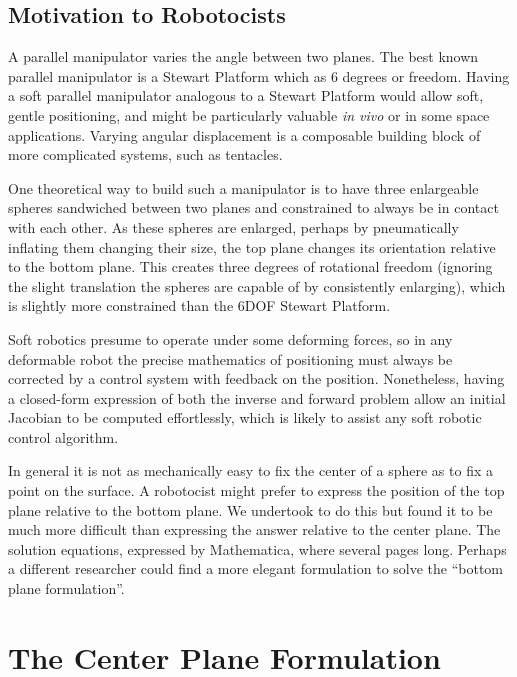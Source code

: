 \documentclass{article}
\begin{document}
\subsection{Motivation to Robotocists}

A parallel manipulator varies the angle between two planes.
The best known parallel manipulator is
a Stewart Platform\cite{wiki:stewart} which as 6 degrees or freedom.
Having a soft parallel manipulator analogous to a Stewart Platform would allow soft,
gentle positioning,
and might be particularly valuable {\it in vivo}\cite{white2018soft} or in some space applications\cite{glassner2020soft}.
Varying angular displacement is a composable building block of more complicated systems, such as tentacles.

One theoretical way to build such a manipulator is to have three enlargeable spheres sandwiched between two planes
and constrained to always be in contact with each other.
As these spheres are enlarged, perhaps by pneumatically inflating them changing
their size, the top plane changes its orientation relative to the bottom plane.
This creates three degrees of rotational freedom
(ignoring the slight translation the spheres are capable of by consistently enlarging),
which is slightly more constrained than the 6DOF Stewart Platform.

Soft robotics presume to operate under some deforming forces, so in any deformable robot the precise mathematics
of positioning must always be corrected by a control system with feedback on the position.
Nonetheless, having a closed-form expression of both the inverse and forward problem allow
an initial Jacobian to be computed effortlessly, which is likely to assist any soft robotic control algorithm.

In general it is not as mechanically easy to fix the center of a sphere as to fix a point on the surface.
A robotocist might prefer to express the position of the top plane relative to the bottom plane.
We undertook to do this but found it to be much more difficult than expressing the answer relative
to the center plane. The solution equations, expressed by Mathematica, where several pages long.
Perhaps a different researcher could find a more elegant formulation to solve the ``bottom plane formulation''.

\section{The Center Plane Formulation}
\end{document}

